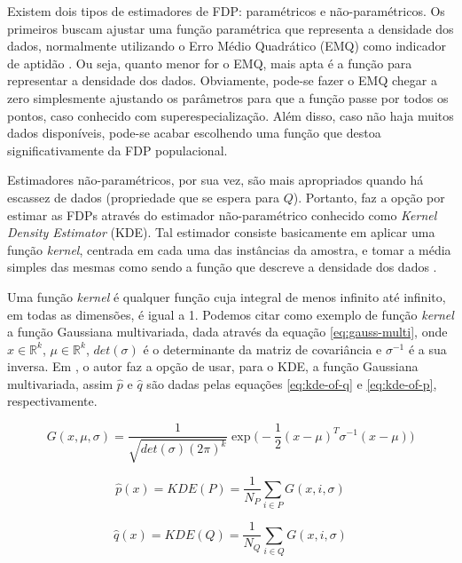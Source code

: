 Existem dois tipos de estimadores de FDP: paramétricos e não-paramétricos. Os primeiros buscam ajustar uma função paramétrica que representa a densidade dos dados, normalmente utilizando o Erro Médio Quadrático (EMQ) como indicador de aptidão \citep{degroot86stat}. Ou seja, quanto menor for o EMQ, mais apta é a função para representar a densidade dos dados. Obviamente, pode-se fazer o EMQ chegar a zero simplesmente ajustando os parâmetros para que a função passe por todos os pontos, caso conhecido com superespecialização. Além disso, caso não haja muitos dados disponíveis, pode-se acabar escolhendo uma função que destoa significativamente da FDP populacional.

Estimadores não-paramétricos, por sua vez, são mais apropriados quando há escassez de dados (propriedade que se espera para $Q$). Portanto, \citep{cadu:2013} faz a opção por estimar as FDPs através do estimador não-paramétrico conhecido como \textit{Kernel Density Estimator} (KDE). Tal estimador consiste basicamente em aplicar uma função \textit{kernel}, centrada em cada uma das instâncias da amostra, e tomar a média simples das mesmas como sendo a função que descreve a densidade dos dados \citep{Duda:2000:PC:954544}. 

Uma função \textit{kernel} é qualquer função cuja integral de menos infinito até infinito, em todas as dimensões, é igual a 1. Podemos citar como exemplo de função \textit{kernel} a função Gaussiana multivariada, dada através da equação \ref{eq:gauss-multi}, onde $x \in \mathbb{R}^k$, $\mu \in \mathbb{R}^k$, $det(\sigma)$ é o determinante da matriz de covariância e $\sigma^{-1}$ é a sua inversa. Em \citep{cadu:2013}, o autor faz a opção de usar, para o KDE, a função Gaussiana multivariada, assim $\hat{p}$ e $\hat{q}$ são dadas pelas equações \ref{eq:kde-of-q} e \ref{eq:kde-of-p}, respectivamente.

\begin{equation}
G(x, \mu, \sigma) = \frac{1}{\sqrt{det(\sigma) (2\pi)^k}} \exp \bigg( -\frac{1}{2} (x - \mu)^T \sigma^{-1} (x - \mu) \bigg)
\label{eq:gauss-multi}
\end{equation}

\begin{equation}
\hat{p}(x) = KDE(P) = \frac{1}{N_{P}} \sum_{i \in P} G(x, i, \sigma) 
\label{eq:kde-of-p}
\end{equation}

\begin{equation}
\hat{q}(x) = KDE(Q) = \frac{1}{N_{Q}} \sum_{i \in Q} G(x, i, \sigma) 
\label{eq:kde-of-q}
\end{equation}

